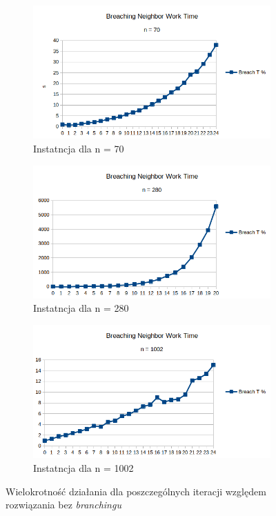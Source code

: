 \documentclass{article}
\begin{document}
\begin{figure}[h!]
 	\centering
 	\begin{subfigure}[b]{0.325\linewidth}
    	\includegraphics[width=\linewidth]{branch_times_70.png}
    	\caption{Instatncja dla n = 70}
	\end{subfigure}
	\begin{subfigure}[b]{0.325\linewidth}
    	\includegraphics[width=\linewidth]{branch_times_280.png}
    	\caption{Instatncja dla n = 280}
	\end{subfigure}
	\begin{subfigure}[b]{0.325\linewidth}
    	\includegraphics[width=\linewidth]{branch_times_1002.png}
    	\caption{Instatncja dla n = 1002}
	\end{subfigure}
  	\caption{Wielokrotność działania dla poszczególnych iteracji względem rozwiązania bez \textit{branchingu}}
\end{figure}
\end{document}
